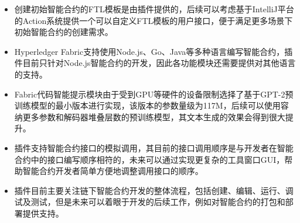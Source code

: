 \begin{itemize}
    \item 创建初始智能合约的FTL模板是由插件提供的，后续可以考虑基于IntelliJ平台的Action系统提供一个可以自定义FTL模板的用户接口，便于满足更多场景下初始智能合约的创建需求。
    \item Hyperledger Fabric支持使用Node.js、Go、Java等多种语言编写智能合约，插件目前只针对Node.js智能合约的开发，因此各功能模块还需要提供对其他语言的支持。
    \item Fabric代码智能提示模块由于受到GPU等硬件的设备限制选择了基于GPT-2预训练模型的最小版本进行实现，该版本的参数量级为117M，后续可以使用容纳更多参数和解码器堆叠层数的预训练模型，其文本生成的效果会得到很大提升。
    \item 插件支持智能合约接口的模拟调用，其目前的接口调用顺序是与开发者在智能合约中的接口编写顺序相符的，未来可以通过实现更复杂的工具窗口GUI，帮助智能合约开发者简单方便地调整调用接口的顺序。
    \item 插件目前主要关注链下智能合约开发的整体流程，包括创建、编辑、运行、调试及测试，但是未来可以着眼于开发的后续工作，例如对智能合约的打包和部署提供支持。
\end{itemize}